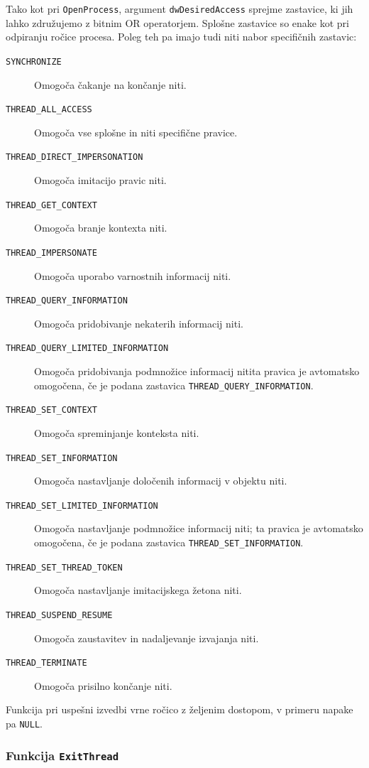 \documentclass[a4paper,12pt,openright]{book}
\begin{document}
Tako kot pri \texttt{OpenProcess}, argument \texttt{dwDesiredAccess} sprejme zastavice, ki jih lahko združujemo z bitnim OR operatorjem.
Splošne zastavice so enake kot pri odpiranju ročice procesa.
Poleg teh pa imajo tudi niti nabor specifičnih zastavic:
\begin{description}
	\item[\texttt{SYNCHRONIZE}] Omogoča čakanje na končanje niti.
	\item[\texttt{THREAD\_ALL\_ACCESS}] Omogoča vse splošne in niti specifične pravice.
	\item[\texttt{THREAD\_DIRECT\_IMPERSONATION}] Omogoča imitacijo pravic niti.
	\item[\texttt{THREAD\_GET\_CONTEXT}] Omogoča branje kontexta niti.
	\item[\texttt{THREAD\_IMPERSONATE}] Omogoča uporabo varnostnih informacij niti.
	\item[\texttt{THREAD\_QUERY\_INFORMATION}] Omogoča pridobivanje nekaterih informacij niti.
	\item[\texttt{THREAD\_QUERY\_LIMITED\_INFORMATION}] Omogoča pridobivanja podmnožice informacij nitita pravica je avtomatsko omogočena, če je podana zastavica \texttt{THREAD\_QUERY\_INFORMATION}.
	\item[\texttt{THREAD\_SET\_CONTEXT}] Omogoča spreminjanje konteksta niti.
	\item[\texttt{THREAD\_SET\_INFORMATION}] Omogoča nastavljanje določenih informacij v obje\-ktu niti.
	\item[\texttt{THREAD\_SET\_LIMITED\_INFORMATION}] Omogoča nastavljanje podmnožice informacij niti; ta pravica je avtomatsko omogočena, če je podana zastavica \texttt{THREAD\_SET\_INFORMATION}.
	\item[\texttt{THREAD\_SET\_THREAD\_TOKEN}] Omogoča nastavljanje imitacijskega žetona niti.
	\item[\texttt{THREAD\_SUSPEND\_RESUME}] Omogoča zaustavitev in nadaljevanje izvajanja niti.
	\item[\texttt{THREAD\_TERMINATE}] Omogoča prisilno končanje niti.
\end{description}

Funkcija pri uspešni izvedbi vrne ročico z željenim dostopom, v primeru napake pa \texttt{NULL}.

\subsubsection{Funkcija \texttt{ExitThread}}
\end{document}

